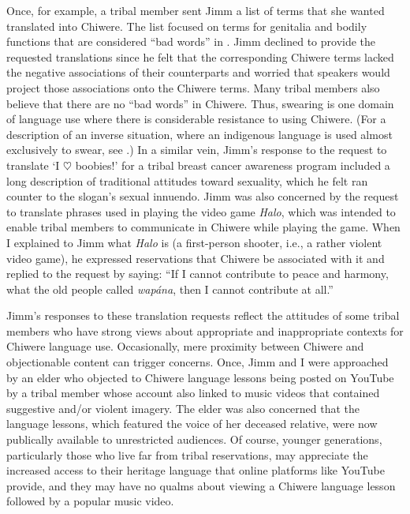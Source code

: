 \documentclass[output=paper]{LSP/langsci}
\begin{document}
Once, for example, a tribal member sent Jimm a list of  terms that she wanted translated into Chiwere. The list focused on terms for genitalia and bodily functions that are considered ``bad words'' in . Jimm declined to provide the requested translations since he felt that the corresponding Chiwere terms lacked the negative associations of their  counterparts and worried that  speakers would project those associations onto the Chiwere terms. Many tribal members also believe that there are no ``bad words'' in Chiwere. Thus, swearing is one domain of language use where there is considerable resistance to using Chiwere. (For a description of an inverse situation, where an indigenous language is used almost exclusively to swear, see \citealt{Muehlmann2008}.) In a similar vein, Jimm's response to the request to translate `I $\heartsuit$ boobies!' for a tribal breast cancer awareness program included a long description of traditional attitudes toward sexuality, which he felt ran counter to the slogan's sexual innuendo. Jimm was also concerned by the request to translate phrases used in playing the video game \emph{Halo}, which was intended to enable tribal members to communicate in Chiwere while playing the game. When I explained to Jimm what \emph{Halo} is (a first-person shooter, i.e., a rather violent video game), he expressed reservations that Chiwere be associated with it and replied to the request by saying: ``If I cannot contribute to peace and harmony, what the old people called \emph{wapána}, then I cannot contribute at all.''

Jimm's responses to these translation requests reflect the attitudes of some tribal members who have strong views about appropriate and inappropriate contexts for Chiwere language use. Occasionally, mere proximity between Chiwere and objectionable content can trigger concerns. Once, Jimm and I were approached by an elder who objected to Chiwere language lessons being posted on YouTube by a tribal member whose account also linked to music videos that contained suggestive and/or violent imagery. The elder was also concerned that the language lessons, which featured the voice of her deceased relative, were now publically available to unrestricted audiences. Of course, younger generations, particularly those who live far from tribal reservations, may appreciate the increased access to their heritage language that online platforms like YouTube provide, and they may have no qualms about viewing a Chiwere language lesson followed by a popular music video.
\end{document}
